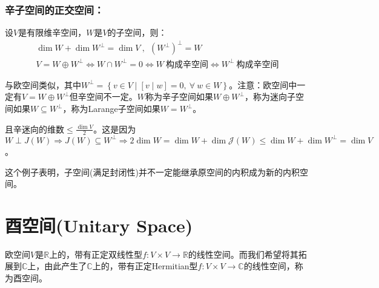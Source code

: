 \documentclass[zihao=-4,UTF8]{report}
\theoremstyle{mystyle} %
\begin{document}
\subsubsection{辛子空间的正交空间：}
设$V$是有限维辛空间，$W$是$V$的子空间，则：
\begin{gather*}
    \dim W + \dim W^{\perp} = \dim V\ , \ \ (W^{\perp})^{\perp} = W\\
    V = W \oplus W^{\perp} \Longleftrightarrow  W \cap  W^{\perp} = {0} \Longleftrightarrow W\ \text{构成辛空间} \Longleftrightarrow W^{\perp}\ \text{构成辛空间} 
\end{gather*}
{\par\color{gray}\small
与欧空间类似，其中$W^{\perp} = \left\{v \in V\mid [v\mid w] = 0,\ \forall\ w \in W \right\}$。注意：欧空间中一定有$V = W \oplus W^{\perp}$但辛空间不一定。$W$称为辛子空间如果$W \oplus W^{\perp}$，称为迷向子空间如果$ W \subseteq W^{\perp}$，称为Larange子空间如果$W = W^{\perp}$。\par
且辛迷向的维数$\le \frac{\dim V}{2}$。这是因为$W \perp J(W) \Longrightarrow J(W) \subseteq W^{\perp} \Longrightarrow 2\dim W = \dim W + \dim \mathcal{J}(W) \le \dim W + \dim W^{\perp} = \dim V$。\par
这个例子表明，子空间(满足封闭性)并不一定能继承原空间的内积成为新的内积空间。
\par}

\section{酉空间(Unitary Space)}
{\par\color{gray}\small
欧空间$V$是$\mathbb{R}$上的，带有正定双线性型$f:V\times V \longrightarrow \mathbb{R}$的线性空间。而我们希望将其拓展到$\mathbb{C}$上，由此产生了$\mathbb{C}$上的，带有正定Hermitian型$f:V\times V \longrightarrow \mathbb{C}$的线性空间，称为酉空间。
\par}
\end{document}
